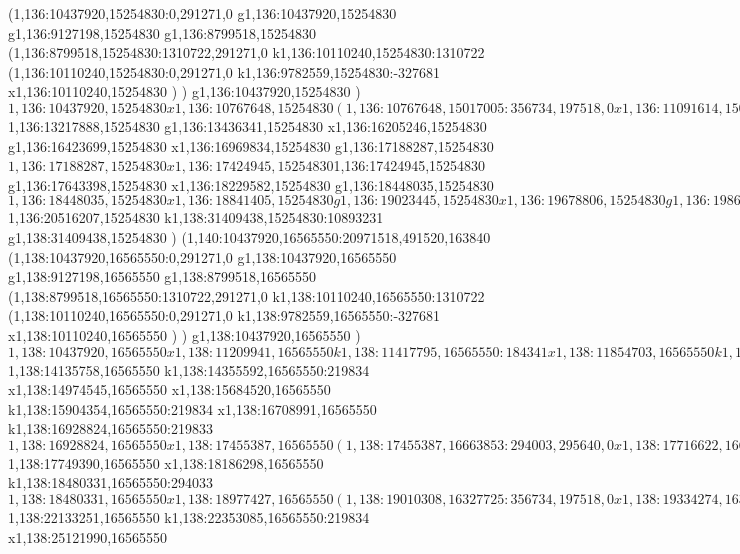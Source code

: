 {(1,136:10437920,15254830:0,291271,0
g1,136:10437920,15254830
g1,136:9127198,15254830
g1,136:8799518,15254830
(1,136:8799518,15254830:1310722,291271,0
k1,136:10110240,15254830:1310722
(1,136:10110240,15254830:0,291271,0
k1,136:9782559,15254830:-327681
x1,136:10110240,15254830
)
)
g1,136:10437920,15254830
)
$1,136:10437920,15254830
x1,136:10767648,15254830
(1,136:10767648,15017005:356734,197518,0
x1,136:11091614,15017005
)
x1,136:11870766,15254830
g1,136:12052806,15254830
x1,136:12708167,15254830
g1,136:12890207,15254830
x1,136:13217888,15254830
$1,136:13217888,15254830
g1,136:13436341,15254830
x1,136:16205246,15254830
g1,136:16423699,15254830
x1,136:16969834,15254830
g1,136:17188287,15254830
$1,136:17188287,15254830
x1,136:17424945,15254830
$1,136:17424945,15254830
g1,136:17643398,15254830
x1,136:18229582,15254830
g1,136:18448035,15254830
$1,136:18448035,15254830
x1,136:18841405,15254830
g1,136:19023445,15254830
x1,136:19678806,15254830
g1,136:19860846,15254830
x1,136:20516207,15254830
$1,136:20516207,15254830
k1,138:31409438,15254830:10893231
g1,138:31409438,15254830
)
(1,140:10437920,16565550:20971518,491520,163840
(1,138:10437920,16565550:0,291271,0
g1,138:10437920,16565550
g1,138:9127198,16565550
g1,138:8799518,16565550
(1,138:8799518,16565550:1310722,291271,0
k1,138:10110240,16565550:1310722
(1,138:10110240,16565550:0,291271,0
k1,138:9782559,16565550:-327681
x1,138:10110240,16565550
)
)
g1,138:10437920,16565550
)
$1,138:10437920,16565550
x1,138:11209941,16565550
k1,138:11417795,16565550:184341
x1,138:11854703,16565550
k1,138:12039045,16565550:184342
x1,138:12512361,16565550
k1,138:12658913,16565550:146552
x1,138:13168639,16565550
k1,138:13315192,16565550:146553
x1,138:13841755,16565550
(1,138:13841755,16663853:294003,295640,0
x1,138:14102990,16663853
)
$1,138:14135758,16565550
k1,138:14355592,16565550:219834
x1,138:14974545,16565550
x1,138:15684520,16565550
k1,138:15904354,16565550:219834
x1,138:16708991,16565550
k1,138:16928824,16565550:219833
$1,138:16928824,16565550
x1,138:17455387,16565550
(1,138:17455387,16663853:294003,295640,0
x1,138:17716622,16663853
)
$1,138:17749390,16565550
x1,138:18186298,16565550
k1,138:18480331,16565550:294033
$1,138:18480331,16565550
x1,138:18977427,16565550
(1,138:19010308,16327725:356734,197518,0
x1,138:19334274,16327725
)
x1,138:20029836,16565550
x1,138:20235394,16565550
k1,138:20344618,16565550:109224
x1,138:20781526,16565550
k1,138:20965868,16565550:184342
x1,138:21621229,16565550
k1,138:21805570,16565550:184341
x1,138:22133251,16565550
$1,138:22133251,16565550
k1,138:22353085,16565550:219834
x1,138:25121990,16565550
}
